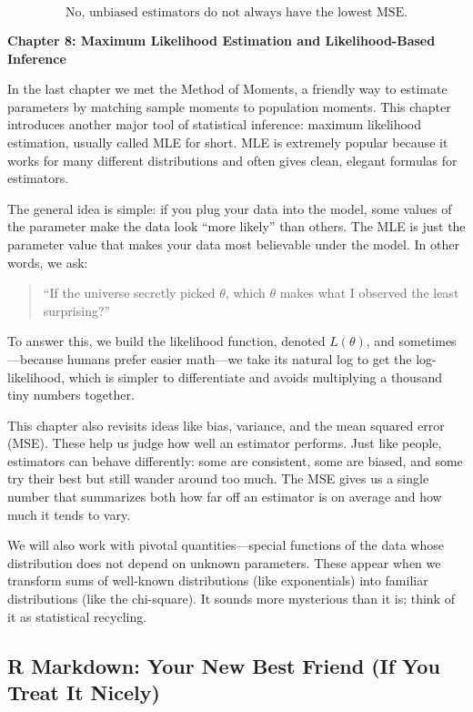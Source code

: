 \documentclass[11pt,letterpaper]{article}
\theoremstyle{remark}
\begin{document}
\[
\boxed{\text{No, unbiased estimators do not always have the lowest MSE.}}
\]


\newpage

\textbf{Chapter 8: Maximum Likelihood Estimation and Likelihood-Based Inference}

\vspace{0.5cm}

In the last chapter we met the Method of Moments, a friendly way to estimate parameters by matching sample moments to population moments. This chapter introduces another major tool of statistical inference: maximum likelihood estimation, usually called MLE for short. MLE is extremely popular because it works for many different distributions and often gives clean, elegant formulas for estimators.

The general idea is simple: if you plug your data into the model, some values of the parameter make the data look ``more likely'' than others. The MLE is just the parameter value that makes your data most believable under the model. In other words, we ask:

\begin{quote}
    ``If the universe secretly picked $\theta$, which $\theta$ makes what I observed the least surprising?''
\end{quote}

To answer this, we build the likelihood function, denoted $L(\theta)$, and sometimes---because humans prefer easier math---we take its natural log to get the log-likelihood, which is simpler to differentiate and avoids multiplying a thousand tiny numbers together.

This chapter also revisits ideas like bias, variance, and the mean squared error (MSE). These help us judge how well an estimator performs. Just like people, estimators can behave differently: some are consistent, some are biased, and some try their best but still wander around too much. The MSE gives us a single number that summarizes both how far off an estimator is on average and how much it tends to vary.

We will also work with pivotal quantities---special functions of the data whose distribution does not depend on unknown parameters. These appear when we transform sums of well-known distributions (like exponentials) into familiar distributions (like the chi-square). It sounds more mysterious than it is; think of it as statistical recycling.

\subsection*{R Markdown: Your New Best Friend (If You Treat It Nicely)}
\end{document}
